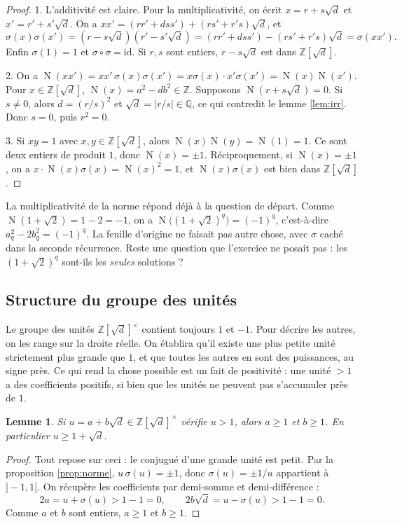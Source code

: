 \documentclass[11pt,a4paper]{article}
\theoremstyle{plain}
\newtheorem{lemme}[theoreme]{Lemme}
\theoremstyle{definition}
\theoremstyle{remark}
\newcommand{\Z}{\mathbb{Z}}
\newcommand{\Q}{\mathbb{Q}}
\DeclareMathOperator{\Nm}{N}
\begin{document}
\begin{proof}
1. L'additivité est claire. Pour la multiplicativité, on écrit $x=r+s\sqrt d$ et $x'=r'+s'\sqrt d$. On a $xx'=(rr'+dss')+(rs'+r's)\sqrt d$, et
\[
  \sigma(x)\sigma(x')=(r-s\sqrt d)(r'-s'\sqrt d)=(rr'+dss')-(rs'+r's)\sqrt d=\sigma(xx').
\]
Enfin $\sigma(1)=1$ et $\sigma\circ\sigma=\mathrm{id}$. Si $r,s$ sont entiers, $r-s\sqrt d$ est dans $\Z[\sqrt d]$.

2. On a $\Nm(xx')=xx'\,\sigma(x)\sigma(x')=x\sigma(x)\cdot x'\sigma(x')=\Nm(x)\Nm(x')$. Pour $x\in\Z[\sqrt d]$, $\Nm(x)=a^2-db^2\in\Z$. Supposons $\Nm(r+s\sqrt d)=0$. Si $s\neq0$, alors $d=(r/s)^2$ et $\sqrt d=|r/s|\in\Q$, ce qui contredit le lemme \ref{lem:irr}. Donc $s=0$, puis $r^2=0$.

3. Si $xy=1$ avec $x,y\in\Z[\sqrt d]$, alors $\Nm(x)\Nm(y)=\Nm(1)=1$. Ce sont deux entiers de produit $1$, donc $\Nm(x)=\pm1$. Réciproquement, si $\Nm(x)=\pm1$, on a $x\cdot\Nm(x)\sigma(x)=\Nm(x)^2=1$, et $\Nm(x)\sigma(x)$ est bien dans $\Z[\sqrt d]$.
\end{proof}

La multiplicativité de la norme répond déjà à la question de départ. Comme $\Nm(1+\sqrt2)=1-2=-1$, on a $\Nm\big((1+\sqrt2)^q\big)=(-1)^q$, c'est-à-dire $a_q^2-2b_q^2=(-1)^q$. La feuille d'origine ne faisait pas autre chose, avec $\sigma$ caché dans la seconde récurrence. Reste une question que l'exercice ne posait pas : les $(1+\sqrt2)^q$ sont-ils les \emph{seules} solutions ?

\subsection{Structure du groupe des unités}

Le groupe des unités $\Z[\sqrt d]^\times$ contient toujours $1$ et $-1$. Pour décrire les autres, on les range sur la droite réelle. On établira qu'il existe une plus petite unité strictement plus grande que $1$, et que toutes les autres en sont des puissances, au signe près. Ce qui rend la chose possible est un fait de positivité : une unité $>1$ a des coefficients positifs, si bien que les unités ne peuvent pas s'accumuler près de $1$.

\begin{lemme}\label{lem:positif}
Si $u=a+b\sqrt d\in\Z[\sqrt d]^\times$ vérifie $u>1$, alors $a\geq1$ et $b\geq1$. En particulier $u\geq1+\sqrt d$.
\end{lemme}

\begin{proof}
Tout repose sur ceci : le conjugué d'une grande unité est petit. Par la proposition \ref{prop:norme}, $u\,\sigma(u)=\pm1$, donc $\sigma(u)=\pm1/u$ appartient à $]-1,1[$. On récupère les coefficients par demi-somme et demi-différence :
\[
  2a=u+\sigma(u)>1-1=0,\qquad 2b\sqrt d=u-\sigma(u)>1-1=0 .
\]
Comme $a$ et $b$ sont entiers, $a\geq1$ et $b\geq1$.
\end{proof}
\end{document}
